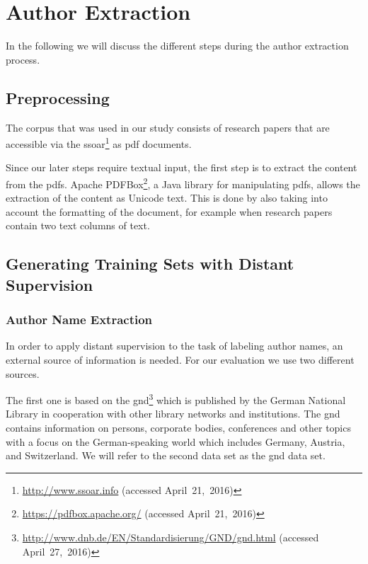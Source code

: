 \chapter{Author Extraction}\label{cha:author-extraction}

In the following we will discuss the different steps during the author extraction process.

\section{Preprocessing}\label{sec:ae-preprocessing}

The corpus that was used in our study consists of  research papers that are accessible via the \gls{ssoar}\footnote{\url{http://www.ssoar.info} (accessed April~21,~2016)} as \gls{pdf} documents.

Since our later steps require textual input, the first step is to extract the content from the \glspl{pdf}.
Apache PDFBox\footnote{\url{https://pdfbox.apache.org/} (accessed April~21,~2016)}, a Java library for manipulating \glspl{pdf}, allows the extraction of the content as Unicode text.
This is done by also taking into account the formatting of the document, for example when research papers contain two text columns of text.

\section{Generating Training Sets with Distant Supervision}\label{sec:ae-distant-supervision}

\subsection{Author Name Extraction}

In order to apply distant supervision to the task of labeling author names, an external source of information is needed.
For our evaluation we use two different sources.

\bigskip

The first one is based on the \acrfull{gnd}\footnote{\url{http://www.dnb.de/EN/Standardisierung/GND/gnd.html} (accessed April~27,~2016)} which is published by the German National Library in cooperation with other library networks and institutions.
The \gls{gnd} contains information on persons, corporate bodies, conferences and other topics with a focus on the German-speaking world which includes Germany, Austria, and Switzerland.
We will refer to the second data set as the \gls{gnd} data set.

